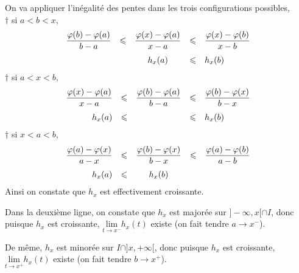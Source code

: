 \documentclass[a4paper,11pt, twoside]{article}
\begin{document}
\begin{Proof}
  On va appliquer l'inégalité des pentes dans les trois configurations possibles,\\
  $\dagger$ si $a<b<x$,
  $$\begin{array}{rcccl}
    \displaystyle\frac{\varphi(b)-\varphi(a)}{b-a}&\leqslant&\displaystyle\frac{\varphi(x)-\varphi(a)}{x-a}&\leqslant& \displaystyle\frac{\varphi(x)-\varphi(b)}{x-b}\\[1.1em]
    &&h_x(a)&\leqslant& h_x(b)
  \end{array}$$
  $\dagger$ si $a<x<b$,
  $$\begin{array}{rcccl}
    \displaystyle\frac{\varphi(x)-\varphi(a)}{x-a}&\leqslant&\displaystyle\frac{\varphi(b)-\varphi(a)}{b-a}&\leqslant& \displaystyle\frac{\varphi(b)-\varphi(x)}{b-x}\\[1.1em]
    h_x(a)&\leqslant& &\leqslant& h_x(b)
  \end{array}$$
  $\dagger$ si $x<a<b$,
  $$\begin{array}{rcccl}
    \displaystyle\frac{\varphi(a)-\varphi(x)}{a-x}&\leqslant&\displaystyle\frac{\varphi(b)-\varphi(x)}{b-x}&\leqslant&\displaystyle\frac{\varphi(a)-\varphi(b)}{a-b}\\[1.1em]
  h_x(a)&\leqslant&h_x(b)&&
  \end{array}$$
  Ainsi on constate que $h_x$ est effectivement croissante.

  Dans la deuxième ligne, on constate que $h_x$ est majorée sur $]-\infty,x[\cap I$, donc puisque $h_x$ est croissante, $\underset{t\to x^-}{\mathrm{lim}}h_x(t)$ existe (on fait tendre $a\to x^-$).

  De même, $h_x$ est minorée sur $I\cap]x,+\infty[$, donc puisque $h_x$ est croissante, $\underset{t\to x^+}{\mathrm{lim}}h_x(t)$ existe (on fait tendre $b\to x^+$).
\end{Proof}
\end{document}
